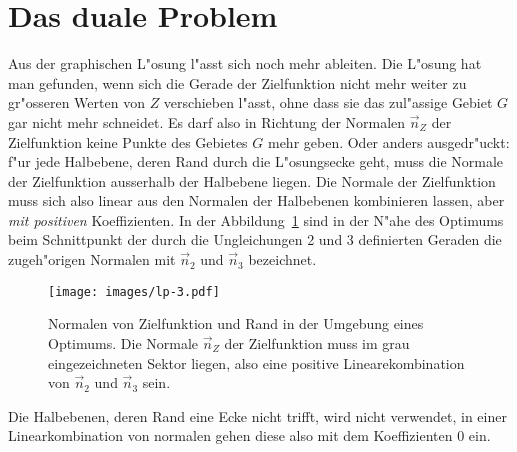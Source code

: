 \section{Das duale Problem\label{lp:section:dual}}
Aus der graphischen L"osung l"asst sich noch mehr ableiten.
Die L"osung hat man gefunden, wenn sich die Gerade der Zielfunktion
nicht mehr weiter zu gr"osseren Werten von $Z$ verschieben l"asst, ohne
dass sie das zul"assige Gebiet $G$ gar nicht mehr schneidet.
Es darf also in Richtung der Normalen $\vec n_Z$ der Zielfunktion keine Punkte
des Gebietes $G$ mehr geben. Oder anders ausgedr"uckt: f"ur jede
Halbebene, deren Rand durch die L"osungsecke geht, muss die Normale der
Zielfunktion ausserhalb der Halbebene liegen.
Die Normale der Zielfunktion muss sich also linear aus den Normalen
der Halbebenen kombinieren lassen, aber {\em mit positiven} Koeffizienten.
In der Abbildung~\ref{lp:normalen} sind in der N"ahe des Optimums beim
Schnittpunkt der durch die Ungleichungen 2 und 3 definierten Geraden
die zugeh"origen Normalen mit $\vec n_2$ und $\vec n_3$ bezeichnet.
\begin{figure}
\begin{center}
\texttt{[image: images/lp-3.pdf]}
\end{center}
\caption{Normalen von Zielfunktion und Rand in der Umgebung eines Optimums.
Die Normale $\vec n_Z$ der Zielfunktion muss im grau eingezeichneten
Sektor liegen, also eine positive Linearekombination von $\vec n_2$ und
$\vec n_3$ sein.
\label{lp:normalen}}
\end{figure}

Die Halbebenen, deren Rand eine Ecke nicht trifft, wird nicht verwendet,
in einer Linearkombination von normalen gehen diese also mit dem
Koeffizienten $0$ ein.

